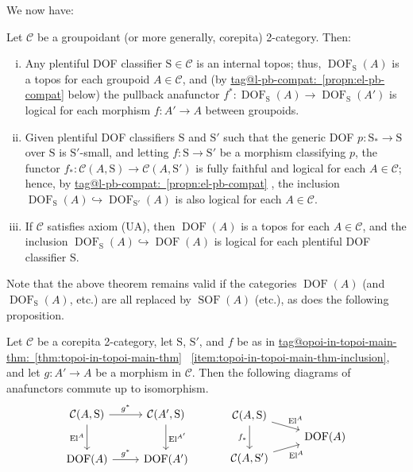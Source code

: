 \documentclass{amsart}
\makeatletter
\newcommand\cC{\mathcal{C}}
\newcommand\DOF{\operatorname{DOF}}
\newcommand\El{\operatorname{El}}
\newcommand\hto{\hookrightarrow}
\newcommand\rS{\mathrm{S}}
\newcommand\SOF{\operatorname{SOF}}
\newcommand\tagword[1]{\csname tag@#1\endcsname}
\def\label@tag#1:#2\@nil{#1}
\newcommand\labeltag[1]{\label@tag#1:\@nil}
\newcommand\jref[1]{%
  \texorpdfstring%
    {\hyperref[#1]{\tagword{\labeltag{#1}}~\ref*{#1}}}%
    {\tagword{\labeltag{#1}}~\ref*{#1}}%
}
\theoremstyle{definition}
\theoremstyle{remark}
\theoremstyle{plainwithref}
\makeatother
\begin{document}
We now have:
\begin{thm} \label{thm:topoi-in-topoi-main-thm}
  Let \( \cC \) be a groupoidant (or more generally, corepita) 2-category.
  Then:
  \begin{enumerate}[(i)]
  \item Any plentiful DOF classifier \( \rS \in \cC \) is an internal topos; thus, \( \DOF_\rS(A) \) is a topos for each groupoid \( A \in \cC \), and (by \jref{propn:el-pb-compat} below) the pullback anafunctor \( f^* \colon \DOF_\rS(A) \to \DOF_\rS(A') \) is logical for each morphism \( f \colon A' \to A \) between groupoids.
  \item\label{item:topoi-in-topoi-main-thm-inclusion} Given plentiful DOF classifiers \( \rS \) and \( \rS' \) such that the generic DOF \( p \colon \rS_* \to \rS \) over \( \rS \) is \( \rS' \)-small, and letting \( f \colon \rS \to \rS' \) be a morphism classifying \( p \), the functor \( f_* \colon \cC(A, \rS) \to \cC(A, \rS') \) is fully faithful and logical for each \( A \in \cC \); hence, by \jref{propn:el-pb-compat}, the inclusion \( \DOF_{\rS}(A) \hto \DOF_{\rS'}(A) \) is also logical for each \( A \in \cC \).
  \item If \( \cC \) satisfies axiom (UA), then \( \DOF(A) \) is a topos for each \( A \in \cC \), and the inclusion \( \DOF_\rS(A) \hto \DOF(A) \) is logical for each plentiful DOF classifier \( \rS \).
  \end{enumerate}
\end{thm}

Note that the above theorem remains valid if the categories \( \DOF(A) \) (and \( \DOF_\rS(A) \), etc.) are all replaced by \( \SOF(A) \) (etc.), as does the following proposition.

\begin{propn} \label{propn:el-pb-compat}
  Let \( \cC \) be a corepita 2-category, let \( \rS \), \( \rS' \), and \( f \) be as in \jref{thm:topoi-in-topoi-main-thm}~\ref{item:topoi-in-topoi-main-thm-inclusion}, and let \( g \colon A' \to A \) be a morphism in \( \cC \).
  Then the following diagrams of anafunctors commute up to isomorphism.
  \[
    \begin{tikzcd}
      \cC(A, \rS) \ar[r, "g^*"] \ar[d, "\El^{A}"'] & \cC(A', \rS) \ar[d, "\El^{A'}"] \\[5pt]
      \DOF(A) \ar[r, "g^*"] & \DOF(A')
    \end{tikzcd}
  \qquad \quad
  \begin{tikzcd}
    \cC(A, \rS) \ar[rd, "\El^A"] \ar[dd, "f_*"'] \\[-16pt]
    & \DOF(A) \\[-16pt]
    \cC(A, \rS') \ar[ru, "\El^A"']
  \end{tikzcd}
  \]
\end{propn}
\end{document}
